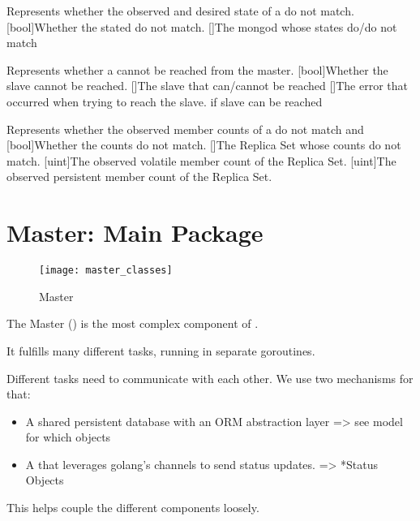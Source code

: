 {
  Represents whether the observed and desired state of a  do not match.
}{
  [bool]{Whether the stated do not match.}
  []{The mongod whose states do/do not match}
}

{
  Represents whether a  cannot be reached from the master.
}{
  [bool]{Whether the slave cannot be reached.}
  []{The slave that can/cannot be reached}
  []{The error that occurred when trying to reach the slave.  if slave can be reached}
}

{
  Represents whether the observed member counts of a  do not match  and 
}{
  [bool]{Whether the counts do not match.}
  []{The Replica Set whose counts do not match.}
  [uint]{The observed volatile member count of the Replica Set.}
  [uint]{The observed persistent member count of the Replica Set.}
}


\section{Master: Main Package}
\renewcommand{\gocurpackage}{master}

\begin{figure}[H]
	\texttt{[image: master\_classes]}
	\caption{Master}
\end{figure}

The Master () is the most complex component of \mamid.

It fulfills many different tasks, running in separate goroutines.

Different tasks need to communicate with each other. We use two mechanisms for that:
\begin{itemize}
	\item A shared persistent database with an ORM abstraction layer => see model for which objects
	\item A  that leverages golang's channels to send status updates. => *Status Objects %
\end{itemize}
This helps couple the different components loosely.

